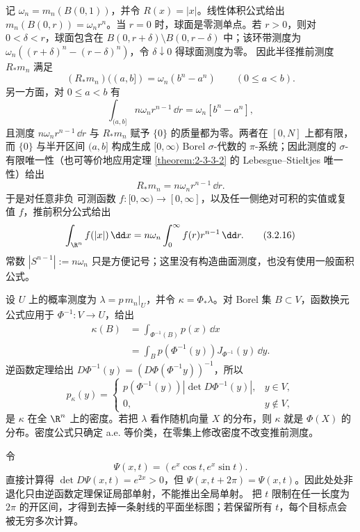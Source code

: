 \begin{example}[球坐标的径向部分]\label{ex:3-2-2-2}
记 $\omega_n=m_n(B(0,1))$，并令 $R(x)=|x|$。线性体积公式给出
$m_n(B(0,r))=\omega_nr^n$。当 $r=0$ 时，球面是零测单点。若 $r>0$，则对
$0<\delta<r$，球面包含在
$B(0,r+\delta)\setminus B(0,r-\delta)$ 中；该环带测度为
$\omega_n((r+\delta)^n-(r-\delta)^n)$，令 $\delta\downarrow0$ 得球面测度为零。
因此半径推前测度 $R_*m_n$ 满足
\[
 (R_*m_n)((a,b])=\omega_n(b^n-a^n)\qquad(0\le a<b).
\]
另一方面，对 $0\le a<b$ 有
\[
 \int_{(a,b]}n\omega_nr^{n-1}\,\dd r
 =\omega_n[b^n-a^n],
\]
且测度 $n\omega_nr^{n-1}\,\dd r$ 与 $R_*m_n$ 赋予 $\{0\}$ 的质量都为零。两者在
$[0,N]$ 上都有限，而 $\{0\}$ 与半开区间 $(a,b]$ 构成生成 $[0,\infty)$ Borel
$\sigma$-代数的 $\pi$-系统；因此测度的 $\sigma$-有限唯一性（也可等价地应用定理
\ref{theorem:2-3-3-2} 的 Lebesgue--Stieltjes 唯一性）给出
\[
 R_*m_n=n\omega_nr^{n-1}\,\dd r.
\]
于是对任意非负
可测函数 $f:[0,\infty)\to[0,\infty]$，以及任一侧绝对可积的实值或复值 $f$，推前积分公式给出
\[
 \int_{\R^n}f(|x|)\,\dd x
 =n\omega_n\int_0^\infty f(r)r^{n-1}\,\dd r.
 \tag{3.2.16}\label{eq:radial-integration}
\]
常数 $|S^{n-1}|:=n\omega_n$ 只是方便记号；这里没有构造曲面测度，也没有使用一般面积公式。
\end{example}

\begin{example}[密度变换]\label{ex:3-2-2-3}
设 $U$ 上的概率测度为 $\lambda=p\,m_n|_U$，并令 $\kappa=\Phi_*\lambda$。对 Borel 集
$B\subset V$，函数换元公式应用于 $\Phi^{-1}:V\to U$，给出
\[
 \begin{aligned}
 \kappa(B)
 &=\int_{\Phi^{-1}(B)}p(x)\,\dd x\\
 &=\int_Bp(\Phi^{-1}(y))J_{\Phi^{-1}}(y)\,\dd y.
 \end{aligned}
\]
逆函数定理给出
$D\Phi^{-1}(y)=(D\Phi(\Phi^{-1}y))^{-1}$，所以
\[
 p_\kappa(y)=
 \begin{cases}
 p(\Phi^{-1}(y))|\det D\Phi^{-1}(y)|,&y\in V,\\
 0,&y\notin V,
 \end{cases}
\]
是 $\kappa$ 在全 $\R^n$ 上的密度。若把 $\lambda$ 看作随机向量 $X$ 的分布，则 $\kappa$ 就是
$\Phi(X)$ 的分布。密度公式只确定 a.e. 等价类，在零集上修改密度不改变推前测度。
\end{example}

\begin{example}\label{ex:3-2-2-4}
令
\[
 \Psi(x,t)=(e^x\cos t,e^x\sin t).
\]
直接计算得 $\det D\Psi(x,t)=e^{2x}>0$，但
$\Psi(x,t+2\pi)=\Psi(x,t)$。因此处处非退化只由逆函数定理保证局部单射，不能推出全局单射。
把 $t$ 限制在任一长度为 $2\pi$ 的开区间，才得到去掉一条射线的平面坐标图；若保留所有
$t$，每个目标点会被无穷多次计算。
\end{example}

